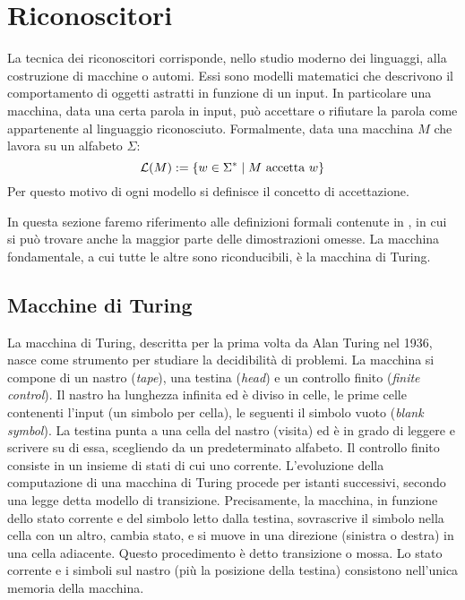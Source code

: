 \section{Riconoscitori}
La tecnica dei riconoscitori corrisponde, nello studio moderno dei linguaggi, alla costruzione di macchine o automi. Essi sono modelli matematici che descrivono il comportamento di oggetti astratti in funzione di un input. In particolare una macchina, data una certa parola in input, può accettare o rifiutare la parola come appartenente al linguaggio riconosciuto. Formalmente, data una macchina $M$ che lavora su un alfabeto $\Sigma$:
\begin{equation*}
	\mathcal L(M) := \left\{ w\in\Sigma^*\mid M\text{ accetta }w \right\}
\end{equation*}
Per questo motivo di ogni modello si definisce il concetto di accettazione.

In questa sezione faremo riferimento alle definizioni formali contenute in \cite{Hopcroft:01:introLFA2}, in cui si può trovare anche la maggior parte delle dimostrazioni omesse. La macchina fondamentale, a cui tutte le altre sono riconducibili, è la macchina di Turing.


\subsection{Macchine di Turing}
La macchina di Turing, descritta per la prima volta da Alan Turing nel 1936, nasce come strumento per studiare la decidibilità di problemi. La macchina si compone di un nastro (\emph{tape}), una testina (\emph{head}) e un controllo finito (\emph{finite control}). Il nastro ha lunghezza infinita ed è diviso in celle, le prime celle contenenti l'input (un simbolo per cella), le seguenti il simbolo vuoto (\emph{blank symbol}). La testina punta a una cella del nastro (visita) ed è in grado di leggere e scrivere su di essa, scegliendo da un predeterminato alfabeto. Il controllo finito consiste in un insieme di stati di cui uno corrente. L'evoluzione della computazione di una macchina di Turing procede per istanti successivi, secondo una legge detta modello di transizione. Precisamente, la macchina, in funzione dello stato corrente e del simbolo letto dalla testina, sovrascrive il simbolo nella cella con un altro, cambia stato, e si muove in una direzione (sinistra o destra) in una cella adiacente. Questo procedimento è detto transizione o mossa. Lo stato corrente e i simboli sul nastro (più la posizione della testina) consistono nell'unica memoria della macchina.

